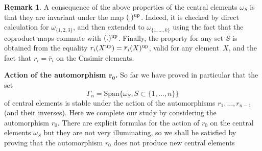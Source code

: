 \documentclass[pdftex]{sigma}
\numberwithin{equation}{section}
\theoremstyle{definition}
\newtheorem{rema}[theo]{Remark}
\newcommand{\rb}{\overline{r}}
\begin{document}
\begin{rema}\label{rema:omegaUp}
A consequence of the above properties of the central elements $\omega_S$ is that they are invariant under the map $(.)^{\rm up}$.
Indeed, it is checked by direct calculation for $\omega_{\{1,2,3\}}$, and then extended to $\omega_{\{1,\dots,k\}}$ using the fact that the coproduct maps commute with $(.)^{\rm up}$. Finally, the property for any set $S$ is obtained from the equality $r_i(X^{\rm up})=\rb_i(X)^{\rm up}$, valid for any element~$X$, and the fact that $r_i=\rb_i$
on the Casimir elements.
\end{rema}

{\bf Action of the automorphism $\boldsymbol{r_0}$.} So far we have proved in particular that the set
\begin{equation*}
\Gamma_n = \text{Span}\{\omega_S , S\subset\{1,\dots,n\}\}
\end{equation*}
of central elements is stable under the action of the automorphisms $r_1,\dots,r_{n-1}$ (and their inverses). Here we complete our study by considering the automorphism $r_0$. There are explicit formulas for the action of $r_0$ on the central elements $\omega_S$ but they are not very illuminating, so we shall be satisfied by proving that the automorphism $r_0$ does not produce new central elements
\end{document}
